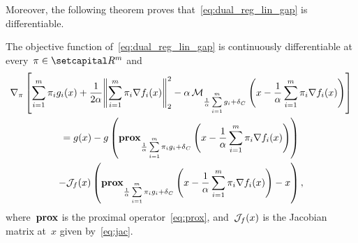 \documentclass[../../main]{subfiles}
\begin{document}
                        Moreover, the following theorem proves that~\cref{eq:dual_reg_lin_gap} is differentiable.
                        \begin{theorem} \label{thm:differentiability of the objective function of w_alpha}
                            The objective function of~\cref{eq:dual_reg_lin_gap} is continuously differentiable at every~$\pi \in \setR^m$ and
                            \begin{multline}
                                \nabla_\pi \left[ \sum_{i = 1}^{m} \pi_i g_i(x) + \frac{1}{2 \alpha} \norm*{\sum_{i = 1}^{m} \pi_i \nabla f_i(x)}_2^2 - \alpha \envelope_{\frac{1}{\alpha} \sum\limits_{i = 1}^{m} g_i + \indicator_C}\left( x - \frac{1}{\alpha} \sum_{i = 1}^{m} \pi_i \nabla f_i(x) \right)  \right] \\
                                = g(x) - g\left( \prox_{\frac{1}{\alpha} \sum\limits_{i = 1}^{m} \pi_i g_i + \indicator_C}\left( x - \frac{1}{\alpha} \sum_{i = 1}^{m} \pi_i \nabla f_i(x) \right) \right) \\
                                - \jdv{f}{x} \left( \prox_{\frac{1}{\alpha} \sum\limits_{i = 1}^{m} \pi_i g_i + \indicator_C}\left( x - \frac{1}{\alpha} \sum_{i = 1}^{m} \pi_i \nabla f_i(x) \right) - x \right) 
                            ,\end{multline}
                            where~$\operatorname{\mathbf{prox}}$ is the proximal operator~\cref{eq:prox}, and~$\mathcal{J}_{f}(x)$ is the Jacobian matrix at~$x$ given by~\cref{eq:jac}.
                        \end{theorem}
\end{document}
